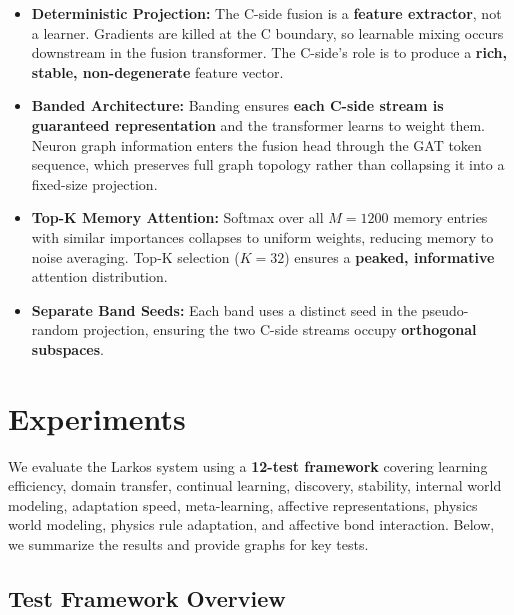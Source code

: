 \documentclass[12pt]{article}
\begin{document}
\begin{itemize}
    \item \textbf{Deterministic Projection:}
    The C-side fusion is a \textbf{feature extractor}, not a learner.
    Gradients are killed at the C boundary, so learnable mixing occurs
    downstream in the fusion transformer. The C-side's role is to
    produce a \textbf{rich, stable, non-degenerate} feature vector.

    \item \textbf{Banded Architecture:}
    Banding ensures \textbf{each C-side stream is guaranteed
    representation} and the transformer learns to weight them.
    Neuron graph information enters the fusion head through the GAT
    token sequence, which preserves full graph topology rather than
    collapsing it into a fixed-size projection.

    \item \textbf{Top-K Memory Attention:}
    Softmax over all $M = 1200$ memory entries with similar importances
    collapses to uniform weights, reducing memory to noise averaging.
    Top-K selection ($K = 32$) ensures a \textbf{peaked, informative}
    attention distribution.

    \item \textbf{Separate Band Seeds:}
    Each band uses a distinct seed in the pseudo-random projection,
    ensuring the two C-side streams occupy \textbf{orthogonal subspaces}.
\end{itemize}


\section{Experiments}
\label{sec:experiments}

We evaluate the Larkos system using a \textbf{12-test framework}
covering learning efficiency, domain transfer, continual learning,
discovery, stability, internal world modeling, adaptation speed,
meta-learning, affective representations, physics world modeling,
physics rule adaptation, and affective bond interaction. Below, we
summarize the results and provide graphs for key tests.

\subsection{Test Framework Overview}
\label{subsec:tests}
\end{document}
